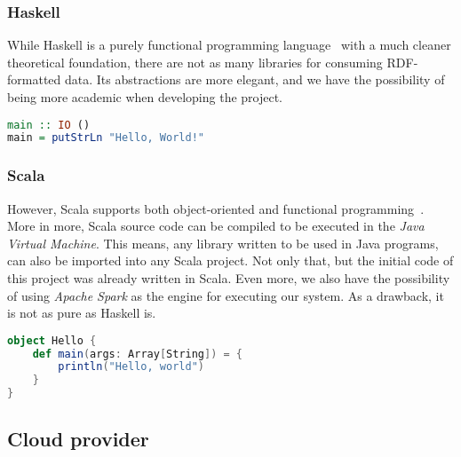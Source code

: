 \subsubsection{Haskell}

While Haskell is a purely functional programming language~\cite{wiki:Haskell} with a much cleaner theoretical foundation, there are not as many libraries for consuming RDF-formatted data. Its abstractions are more elegant, and we have the possibility of being more academic when developing the project.

\begin{lstlisting}[language=Haskell, caption=\textit{Hello World!} program written in Haskell]
main :: IO ()
main = putStrLn "Hello, World!"
\end{lstlisting}

\subsubsection{Scala}

However, Scala supports both object-oriented and functional programming~\cite{wiki:Scala_programming_language}. More in more, Scala source code can be compiled to be executed in the \textit{Java Virtual Machine}. This means, any library written to be used in Java programs, can also be imported into any Scala project. Not only that, but the initial code of this project was already written in Scala. Even more, we also have the possibility of using \textit{Apache Spark} as the engine for executing our system. As a drawback, it is not as pure as Haskell is.

\begin{lstlisting}[language=Scala, caption=\textit{Hello World!} program written in Scala 2]
object Hello {
    def main(args: Array[String]) = {
        println("Hello, world")
    }
}
\end{lstlisting}

\subsection{Cloud provider}